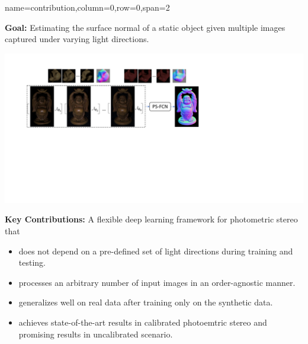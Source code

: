 \documentclass[a0paper,landscape]{baposter}
\begin{document}
\begin{poster}
    {name=contribution,column=0,row=0,span=2}
    {
        \textbf{\color{blue}Goal:} Estimating the surface normal of a static object given multiple images captured under varying light directions.
        \begin{center}
            \vspace{-0.8em}
            \centering\includegraphics[width=0.8\linewidth]{images/Intro}
        \end{center}
        \vspace{-0.8em}
        \textbf{\color{blue}Key Contributions:}
        A flexible deep learning framework for photometric stereo that 
        \begin{itemize}
            \item does not depend on a pre-defined set of light directions during training and testing.
            \item processes an arbitrary number of input images in an order-agnostic manner.
            \item generalizes well on real data after training only on the synthetic data.
            \item achieves state-of-the-art results in calibrated photoemtric stereo and promising results in uncalibrated scenario.
        \end{itemize}  
    }


\end{poster}
\end{document}
